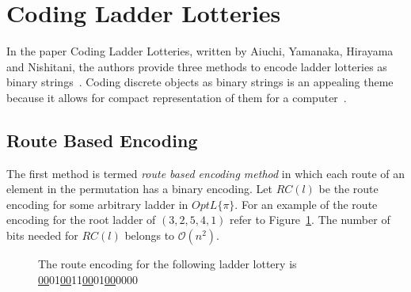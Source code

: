 \section{Coding Ladder Lotteries}
In the paper Coding Ladder Lotteries, written by Aiuchi, Yamanaka, Hirayama and Nishitani, the authors provide three methods to encode ladder lotteries as 
binary strings~\cite{A5}. Coding discrete objects as binary strings is an appealing theme because 
it allows for compact representation of them for a computer~\cite{A5}.
\subsection{Route Based Encoding}
The first method is termed \emph{route based encoding method} in 
which each route of an element in the permutation has a binary encoding. Let $RC(l)$ be the route encoding for 
some arbitrary ladder in $OptL\{\pi\}$. 
For an example of the route encoding for the root ladder of $(3,2,5,4,1)$ refer to 
Figure~\ref{fig:route-encoding}. The number of bits needed for $RC(l)$ 
belongs to $\mathcal{O}(n^{2})$.\par 
\begin{figure}[!htp]
    \begin{center}
    \end{center}
   
 \caption{The route encoding for the following ladder lottery is \underline{00}01\underline{00}11\underline{00}01\underline{00}0000}
 \label{fig:route-encoding}

\end{figure}

